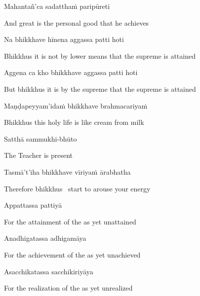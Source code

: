 Mahantañ'ca sadatthaṁ paripūreti

\begin{english}
  And great is the personal good that he achieves
\end{english}

Na bhikkhave hīnena aggassa patti hoti

\begin{english}
  Bhikkhus it is not by lower means that the supreme is attained
\end{english}

Aggena ca kho bhikkhave aggassa patti hoti

\begin{english}
  But bhikkhus it is by the supreme that the supreme is attained
\end{english}

Maṇḍapeyyam'idaṁ bhikkhave brahmacariyaṁ

\begin{english}
  Bhikkhus this holy life is like cream from milk\makeatletter\hyperlink{endnote89-appendix}\makeatother
\end{english}

Satthā sammukhī-bhūto

\begin{english}
  The Teacher is present
\end{english}

Tasmā't'iha bhikkhave vīriyaṁ ārabhatha

\begin{english}
  Therefore bhikkhus \breathmark\ start to arouse your energy
\end{english}

Appattassa pattiyā

\begin{english}
  For the attainment of the as yet unattained
\end{english}

Anadhigatassa adhigamāya

\begin{english}
  For the achievement of the as yet unachieved
\end{english}

Asacchikatassa sacchikiriyāya

\begin{english}
  For the realization of the as yet unrealized
\end{english}

